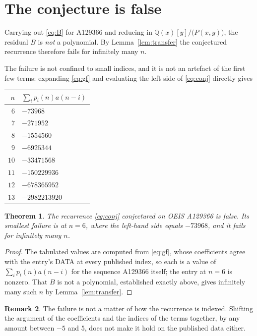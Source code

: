 \documentclass[11pt,a4paper]{article}
\theoremstyle{plain}
\newtheorem{theorem}{Theorem}
\theoremstyle{definition}
\newtheorem{remark}[theorem]{Remark}
\begin{document}
\section{The conjecture is false}

Carrying out \eqref{eq:B} for A129366 and reducing in $\mathbb{Q}(x)[y]/\bigl(P(x,y)\bigr)$, the residual $B$ is
\emph{not} a polynomial. By Lemma~\ref{lem:transfer} the conjectured recurrence therefore
fails for infinitely many $n$.

The failure is not confined to small indices, and it is not an artefact of the first few
terms: expanding \eqref{eq:gf} and evaluating the left side of \eqref{eq:conj} directly
gives

\begin{center}
\begin{tabular}{r@{\qquad}l}
$n$ & $\sum_{i}p_{i}(n)a(n-i)$ \\ \hline
$6$ & $-73968$ \\
$7$ & $-271952$ \\
$8$ & $-1554560$ \\
$9$ & $-6925344$ \\
$10$ & $-33471568$ \\
$11$ & $-150229936$ \\
$12$ & $-678365952$ \\
$13$ & $-2982213920$
\end{tabular}
\end{center}

\begin{theorem}
The recurrence \eqref{eq:conj} conjectured on OEIS A129366 is false. Its smallest failure
is at $n=6$, where the left-hand side equals $-73968$, and it fails for
infinitely many $n$.
\end{theorem}

\begin{proof}
The tabulated values are computed from \eqref{eq:gf}, whose coefficients agree with the
entry's DATA at every published index, so each is a value of $\sum_{i}p_{i}(n)a(n-i)$ for
the sequence A129366 itself; the entry at $n=6$ is nonzero. That $B$ is not a
polynomial, established exactly above, gives infinitely many such $n$ by
Lemma~\ref{lem:transfer}.
\end{proof}

\begin{remark}
The failure is not a matter of how the recurrence is indexed. Shifting the argument of the coefficients and the indices of the terms together, by any amount between $-5$ and $5$, does not make it hold on the published data either.
\end{remark}
\end{document}
